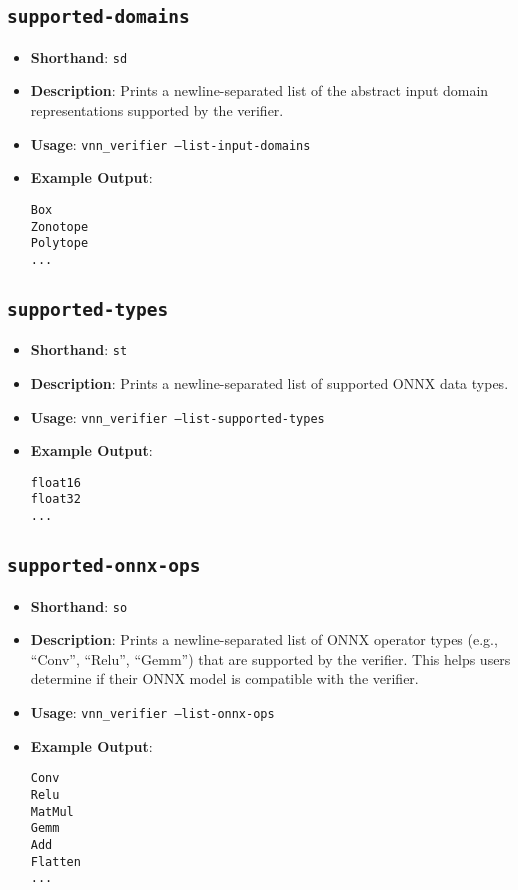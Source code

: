 \subsection{\texttt{supported-domains}}
\begin{itemize}
    \item \textbf{Shorthand}: \texttt{sd}
    \item \textbf{Description}: Prints a newline-separated list of the abstract input domain representations supported by the verifier. 
    \item \textbf{Usage}: \texttt{vnn\_verifier --list-input-domains}
    \item \textbf{Example Output}:
    \begin{lstlisting}[style=bash, numbers=none, frame=none, backgroundcolor=\color{white}]
Box
Zonotope
Polytope
...
    \end{lstlisting}
\end{itemize}

\subsection{\texttt{supported-types}}
\begin{itemize}
    \item \textbf{Shorthand}: \texttt{st}
    \item \textbf{Description}: Prints a newline-separated list of supported ONNX data types.
    \item \textbf{Usage}: \texttt{vnn\_verifier --list-supported-types}
    \item \textbf{Example Output}:
    \begin{lstlisting}[style=bash, numbers=none, frame=none, backgroundcolor=\color{white}]
float16
float32
...
    \end{lstlisting}
\end{itemize}

\subsection{\texttt{supported-onnx-ops}}
\begin{itemize}
    \item \textbf{Shorthand}: \texttt{so}
    \item \textbf{Description}: Prints a newline-separated list of ONNX operator types (e.g., ``Conv'', ``Relu'', ``Gemm'') that are supported by the verifier. 
	This helps users determine if their ONNX model is compatible with the verifier.
    \item \textbf{Usage}: \texttt{vnn\_verifier --list-onnx-ops}
    \item \textbf{Example Output}:
    \begin{lstlisting}[style=bash, numbers=none, frame=none, backgroundcolor=\color{white}]
Conv
Relu
MatMul
Gemm
Add
Flatten
...
    \end{lstlisting}
\end{itemize}